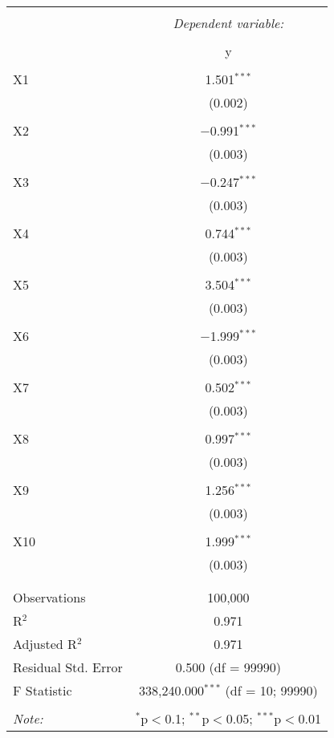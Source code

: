 \documentclass{article}
\begin{document}
\begin{table}[!htbp] \centering
  \caption{}
  \label{Regression}
\begin{tabular}{@{\extracolsep{5pt}}lc}
\\[-1.8ex]\hline
\hline \\[-1.8ex]
 & \multicolumn{1}{c}{\textit{Dependent variable:}} \\
\cline{2-2}
\\[-1.8ex] & y \\
\hline \\[-1.8ex]
 X1 & 1.501$^{***}$ \\
  & (0.002) \\
  & \\
 X2 & $-$0.991$^{***}$ \\
  & (0.003) \\
  & \\
 X3 & $-$0.247$^{***}$ \\
  & (0.003) \\
  & \\
 X4 & 0.744$^{***}$ \\
  & (0.003) \\
  & \\
 X5 & 3.504$^{***}$ \\
  & (0.003) \\
  & \\
 X6 & $-$1.999$^{***}$ \\
  & (0.003) \\
  & \\
 X7 & 0.502$^{***}$ \\
  & (0.003) \\
  & \\
 X8 & 0.997$^{***}$ \\
  & (0.003) \\
  & \\
 X9 & 1.256$^{***}$ \\
  & (0.003) \\
  & \\
 X10 & 1.999$^{***}$ \\
  & (0.003) \\
  & \\
\hline \\[-1.8ex]
Observations & 100,000 \\
R$^{2}$ & 0.971 \\
Adjusted R$^{2}$ & 0.971 \\
Residual Std. Error & 0.500 (df = 99990) \\
F Statistic & 338,240.000$^{***}$ (df = 10; 99990) \\
\hline
\hline \\[-1.8ex]
\textit{Note:}  & \multicolumn{1}{r}{$^{*}$p$<$0.1; $^{**}$p$<$0.05; $^{***}$p$<$0.01} \\
\end{tabular}
\end{table}
\end{document}
